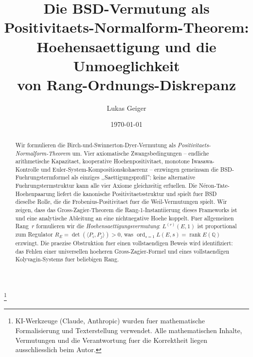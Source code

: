 \documentclass[aps,prd,twocolumn,superscriptaddress,nofootinbib]{revtex4-2}
\theoremstyle{definition}
\theoremstyle{remark}
\DeclareMathOperator{\ord}{ord}
\DeclareMathOperator{\rank}{rank}
\begin{document}

\title{Die BSD-Vermutung als Positivitaets-Normalform-Theorem:\\Hoehensaettigung und die Unmoeglichkeit\\von Rang-Ordnungs-Diskrepanz}

\author{Lukas Geiger}

\date{\today}

\begin{abstract}
Wir formulieren die Birch-und-Swinnerton-Dyer-Vermutung als \textit{Positivitaets-Normalform-Theorem} um. Vier axiomatische Zwangsbedingungen -- endliche arithmetische Kapazitaet, kooperative Hoehenpositivitaet, monotone Iwasawa-Kontrolle und Euler-System-Kompositionskohaerenz -- erzwingen gemeinsam die BSD-Fuehrungstermformel als einziges ,,Saettigungsprofil'': keine alternative Fuehrungstermstruktur kann alle vier Axiome gleichzeitig erfuellen. Die N\'eron-Tate-Hoehenpaarung liefert die kanonische Positivitaetsstruktur und spielt fuer BSD dieselbe Rolle, die die Frobenius-Positivitaet fuer die Weil-Vermutungen spielt. Wir zeigen, dass das Gross-Zagier-Theorem die Rang-1-Instantiierung dieses Frameworks ist und eine analytische Ableitung an eine nichtnegative Hoehe koppelt. Fuer allgemeinen Rang~$r$ formulieren wir die \textit{Hoehensaettigungsvermutung}: $L^{(r)}(E,1)$ ist proportional zum Regulator $R_E = \det(\langle P_i, P_j \rangle) > 0$, was $\ord_{s=1} L(E,s) = \rank E(\mathbb{Q})$ erzwingt. Die praezise Obstruktion fuer einen vollstaendigen Beweis wird identifiziert: das Fehlen einer universellen hoeheren Gross-Zagier-Formel und eines vollstaendigen Kolyvagin-Systems fuer beliebigen Rang.
\end{abstract}


\thanks{KI-Werkzeuge (Claude, Anthropic) wurden fuer mathematische Formalisierung und Texterstellung verwendet. Alle mathematischen Inhalte, Vermutungen und die Verantwortung fuer die Korrektheit liegen ausschliesslich beim Autor.}

\maketitle
\end{document}
